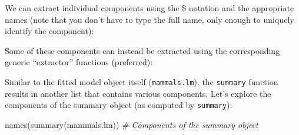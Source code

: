 \documentclass[
]{article}
\newenvironment{Shaded}{\begin{snugshade}}{\end{snugshade}}
\newcommand{\AttributeTok}[1]{\textcolor[rgb]{0.77,0.63,0.00}{#1}}
\newcommand{\CommentTok}[1]{\textcolor[rgb]{0.56,0.35,0.01}{\textit{#1}}}
\newcommand{\FunctionTok}[1]{\textcolor[rgb]{0.00,0.00,0.00}{#1}}
\newcommand{\NormalTok}[1]{#1}
\newcommand{\SpecialCharTok}[1]{\textcolor[rgb]{0.00,0.00,0.00}{#1}}
\newcommand{\StringTok}[1]{\textcolor[rgb]{0.31,0.60,0.02}{#1}}
\begin{document}
We can extract individual components using the \$ notation and the
appropriate names (note that you don't have to type the full name, only
enough to uniquely identify the component):

\begin{Shaded}
\end{Shaded}

Some of these components can instead be extracted using the
corresponding generic ``extractor'' functions (preferred):

\begin{Shaded}
\end{Shaded}

Similar to the fitted model object itself (\texttt{mammals.lm}), the
\texttt{summary} function results in another list that contains various
components. Let's explore the components of the summary object (as
computed by \texttt{summary}):

\begin{Shaded}
\begin{Highlighting}[]
\FunctionTok{names}\NormalTok{(}\FunctionTok{summary}\NormalTok{(mammals.lm))       }\CommentTok{\# Components of the summary object}
\end{Highlighting}
\end{Shaded}
\end{document}
